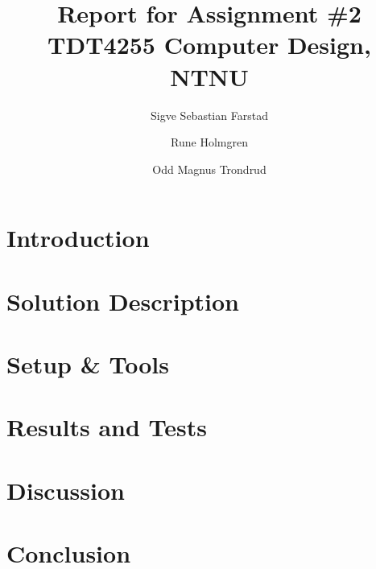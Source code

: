 


\title{Report for Assignment \#2 \\
TDT4255 Computer Design, NTNU}
\author{Sigve Sebastian Farstad \and
		Rune Holmgren \and
		Odd Magnus Trondrud}




\maketitle


\begin{abstract}
	
\end{abstract}

\tableofcontents

\listoffigures

\listoftables

\chapter{Introduction}


	

\chapter{Solution Description}
	

\chapter{Setup \& Tools}
	

\chapter{Results and Tests}
	

\chapter{Discussion}
	

\chapter{Conclusion}
	



{}

\nocite{*} %



